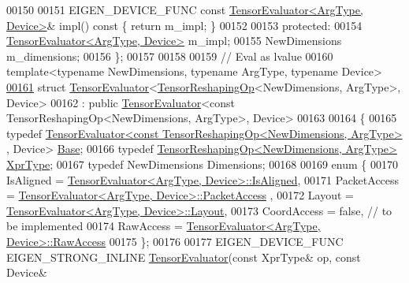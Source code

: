 \begin{DoxyCode}
00150 
00151   EIGEN\_DEVICE\_FUNC \textcolor{keyword}{const} \hyperlink{struct_eigen_1_1_tensor_evaluator}{TensorEvaluator<ArgType, Device>}& impl()\textcolor{keyword}{ const }\{ \textcolor{keywordflow}{
      return} m\_impl; \}
00152 
00153  \textcolor{keyword}{protected}:
00154   \hyperlink{struct_eigen_1_1_tensor_evaluator}{TensorEvaluator<ArgType, Device>} m\_impl;
00155   NewDimensions m\_dimensions;
00156 \};
00157 
00158 
00159 \textcolor{comment}{// Eval as lvalue}
00160 \textcolor{keyword}{template}<\textcolor{keyword}{typename} NewDimensions, \textcolor{keyword}{typename} ArgType, \textcolor{keyword}{typename} Device>
\hyperlink{struct_eigen_1_1_tensor_evaluator_3_01_tensor_reshaping_op_3_01_new_dimensions_00_01_arg_type_01_4_00_01_device_01_4}{00161}   \textcolor{keyword}{struct }\hyperlink{struct_eigen_1_1_tensor_evaluator}{TensorEvaluator}<\hyperlink{class_eigen_1_1_tensor_reshaping_op}{TensorReshapingOp}<NewDimensions, ArgType>, Device>
00162   : \textcolor{keyword}{public} \hyperlink{struct_eigen_1_1_tensor_evaluator}{TensorEvaluator}<const TensorReshapingOp<NewDimensions, ArgType>, Device>
00163 
00164 \{
00165   \textcolor{keyword}{typedef} \hyperlink{struct_eigen_1_1_tensor_evaluator}{TensorEvaluator<const TensorReshapingOp<NewDimensions, ArgType>}
      , Device> \hyperlink{struct_eigen_1_1_tensor_evaluator_3_01const_01_tensor_reshaping_op_3_01_new_dimensions_00_01_arg_type_01_4_00_01_device_01_4}{Base};
00166   \textcolor{keyword}{typedef} \hyperlink{class_eigen_1_1_tensor_reshaping_op}{TensorReshapingOp<NewDimensions, ArgType>} 
      \hyperlink{class_eigen_1_1_tensor_reshaping_op}{XprType};
00167   \textcolor{keyword}{typedef} NewDimensions Dimensions;
00168 
00169   \textcolor{keyword}{enum} \{
00170     IsAligned = \hyperlink{struct_eigen_1_1_tensor_evaluator}{TensorEvaluator<ArgType, Device>::IsAligned},
00171     PacketAccess = \hyperlink{struct_eigen_1_1_tensor_evaluator}{TensorEvaluator<ArgType, Device>::PacketAccess}
      ,
00172     Layout = \hyperlink{struct_eigen_1_1_tensor_evaluator}{TensorEvaluator<ArgType, Device>::Layout},
00173     CoordAccess = \textcolor{keyword}{false},  \textcolor{comment}{// to be implemented}
00174     RawAccess = \hyperlink{struct_eigen_1_1_tensor_evaluator}{TensorEvaluator<ArgType, Device>::RawAccess}
00175   \};
00176 
00177   EIGEN\_DEVICE\_FUNC EIGEN\_STRONG\_INLINE \hyperlink{struct_eigen_1_1_tensor_evaluator}{TensorEvaluator}(\textcolor{keyword}{const} XprType& op, \textcolor{keyword}{const} Device& 

\end{DoxyCode}

